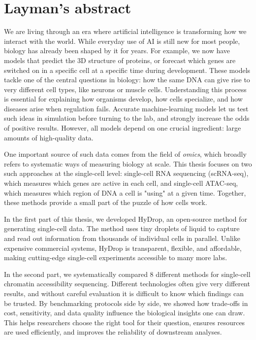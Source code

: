 \chapter*{Layman's abstract}
We are living through an era where artificial intelligence is transforming how we interact with the world. While everyday use of AI is still new for most people, biology has already been shaped by it for years. For example, we now have models that predict the 3D structure of proteins, or forecast which genes are switched on in a specific cell at a specific time during development. These models tackle one of the central questions in biology: how the same DNA can give rise to very different cell types, like neurons or muscle cells. Understanding this process is essential for explaining how organisms develop, how cells specialize, and how diseases arise when regulation fails. Accurate machine-learning models let us test such ideas in simulation before turning to the lab, and strongly increase the odds of positive results. However, all models depend on one crucial ingredient: large amounts of high-quality data.

One important source of such data comes from the field of \textit{omics}, which broadly refers to systematic ways of measuring biology at scale. This thesis focuses on two such approaches at the single-cell level: single-cell RNA sequencing (scRNA-seq), which measures which genes are active in each cell, and single-cell ATAC-seq, which measures which region of DNA a cell is "using" at a given time. Together, these methods provide a small part of the puzzle of how cells work.

In the first part of this thesis, we developed HyDrop, an open-source method for generating single-cell data. The method uses tiny droplets of liquid to capture and read out information from thousands of individual cells in parallel. Unlike expensive commercial systems, HyDrop is transparent, flexible, and affordable, making cutting-edge single-cell experiments accessible to many more labs.

In the second part, we systematically compared 8 different methods for single-cell chromatin accessibility sequencing. Different technologies often give very different results, and without careful evaluation it is difficult to know which findings can be trusted. By benchmarking protocols side by side, we showed how trade-offs in cost, sensitivity, and data quality influence the biological insights one can draw. This helps researchers choose the right tool for their question, ensures resources are used efficiently, and improves the reliability of downstream analyses.

